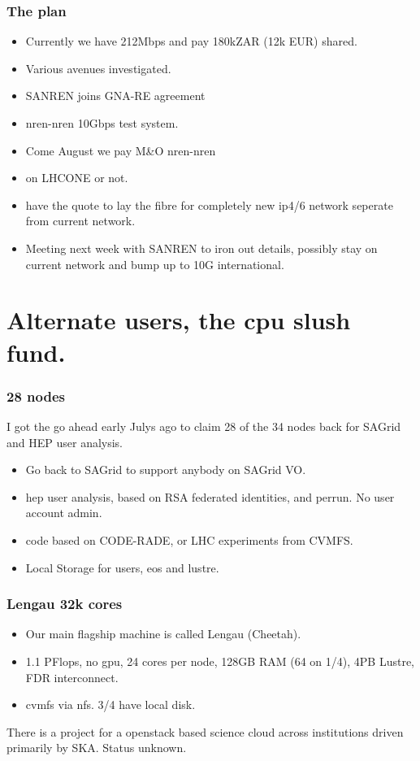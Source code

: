 \documentclass{beamer}
\begin{document}
\begin{frame}
    \frametitle{The plan}
    \begin{itemize}
        \item<1-> Currently we have 212Mbps and pay 180kZAR (12k EUR) shared.
        \item<2-> Various avenues investigated.
        \item<3-> SANREN joins GNA-RE agreement 
        \item<4-> nren-nren 10Gbps test system.
        \item<5-> Come August we pay M\&O nren-nren
        \item<5-> on LHCONE or not.
    \end{itemize}
    \begin{itemize}
        \item<6-> have the quote to lay the fibre for completely new ip4/6 network seperate from current network.
        \item<7->  Meeting next week with SANREN to iron out details, possibly stay on current network and bump up to 10G international.
    \end{itemize} 
\end{frame}




\section{Alternate users, the cpu slush fund.}

\begin{frame}
\frametitle{28 nodes}
I got the go ahead early Julys ago to claim 28 of the 34 nodes back for SAGrid and HEP user analysis.
\begin{itemize}
  \item Go back to SAGrid to support anybody on SAGrid VO.
  \item hep user analysis, based on RSA federated identities, and perrun. No user account admin.
  \item code based on CODE-RADE, or LHC experiments from CVMFS.
  \item Local Storage for users, eos and lustre.
\end{itemize}
\end{frame}

\begin{frame}
    \frametitle{Lengau 32k cores}
    \begin{itemize}
    \item Our main flagship machine is called Lengau (Cheetah).
    \item 1.1 PFlops, no gpu, 24 cores per node, 128GB RAM (64 on 1/4), 4PB Lustre, FDR interconnect.
    \item cvmfs via nfs. 3/4 have local disk.
    \end{itemize}
There is a project for a openstack based science cloud across institutions driven primarily by SKA. Status unknown.    
\end{frame}
\end{document}
